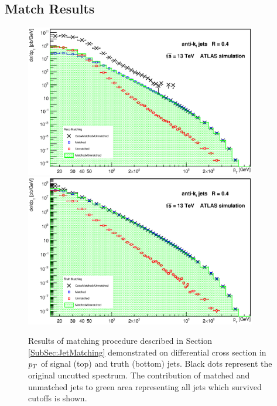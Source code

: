 \begin{appendices}
\section{Match Results}
\begin{figure}[H]
  \centering
  \includegraphics[width=0.9\textwidth]{Chapter3/SignalMatching.eps}
  \includegraphics[width=0.9\textwidth]{Chapter3/TruthMatching.eps}
  \caption{Results of matching procedure described in Section
  \ref{SubSec:JetMatching} demonstrated on differential cross section in $p_{T}$ of
  signal (top) and truth (bottom) jets. Black dots represent the original
  uncutted spectrum. The contribution of matched and unmatched jets to
  green area representing all jets which survived cutoffs is shown.}
  \label{fig:Matching}
\end{figure}


\end{appendices}
